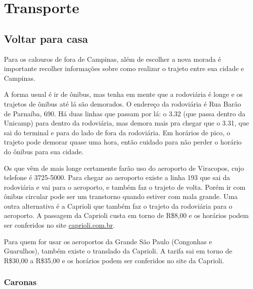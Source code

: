 
\section{Transporte}
\subsection{Voltar para casa}

Para os calouros de fora de Campinas, além de escolher a nova morada
é importante recolher informações sobre como realizar o trajeto entre sua cidade
e Campinas.

A forma usual é ir de ônibus, mas tenha em mente que a rodoviária é longe e os
trajetos de ônibus até lá são demorados. O endereço da rodoviária é Rua Barão de
Parnaíba, 690. Há duas linhas que passam por lá: o 3.32 (que passa dentro da
Unicamp) para dentro da rodoviária, mas demora mais pra chegar que o 3.31, que
sai do terminal e para do lado de fora da rodoviária. Em horários de pico,
o trajeto pode demorar quase uma hora, então cuidado para não perder o horário
do ônibus para sua cidade.

Os que vêm de mais longe certamente farão uso do aeroporto de Viracopos, cujo
telefone é 3725-5000. Para chegar ao aeroporto existe a linha 193 que sai da
rodoviária e vai para o aeroporto, e também faz o trajeto de volta. Porém ir com
ônibus circular pode ser um transtorno quando estiver com mala grande. Uma outra
alternativa é a Caprioli que também faz o trajeto da rodoviária para
o aeroporto. A passagem da Caprioli custa em torno de R\$8,00 e os horários
podem ser conferidos no site \url{caprioli.com.br}.

Para quem for usar os aeroportos da Grande São Paulo (Congonhas e Guarulhos),
também existe o translado da Caprioli. A tarifa sai em torno de R\$30,00
a R\$35,00 e os horários podem ser conferidos no site da Caprioli.

\subsubsection{Caronas}

